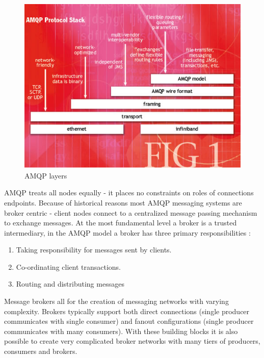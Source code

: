 \documentclass{thesis}
\begin{document}
\begin{figure}[h]
\centering
\includegraphics[scale=.75]{ohara1.jpg}  
\caption{AMQP layers}
\end{figure}

AMQP treats all nodes equally - it places no constraints on roles of connections endpoints.   Because of historical reasons most AMQP messaging systems are broker centric - client nodes connect to a centralized message passing mechanism to exchange messages.  At the most fundamental level a broker is a trusted intermediary, in the AMQP model a broker has three primary responsibilities \cite{O'Hara}:

\begin{enumerate}
\item Taking responsibility for messages sent by clients.
\item Co-ordinating client transactions.
\item Routing and distributing messages 
\end{enumerate}

Message brokers all for the creation of messaging networks with varying complexity.  Brokers typically support both direct connections (single producer communicates with single consumer) and fanout configurations (single producer communicates with many consumers).  With these building blocks it is also possible to create very complicated broker networks with many tiers of producers, consumers and brokers. 
\end{document}
